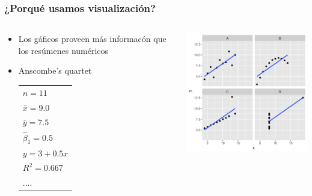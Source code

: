 \documentclass[9pt, spanish]{beamer}\usepackage[]{graphicx}\usepackage[]{color}
\begin{document}
\begin{frame}
\frametitle{¿Porqu\'e usamos visualizaci\'on?}

\begin{columns}
\begin{column}{4cm}
\begin{itemize}
\item Los g\'aficos proveen m\'as informac\'on que los res\'umenes num\'ericos
\item Anscombe’s quartet \cite{anscombe}
\begin{tabular}{l}
 $n = 11$ \\
$\bar x= 9.0$ \\
 $\bar y = 7.5$ \\
 $\hat \beta_1= 0.5$ \\
$ y = 3 + 0.5 x$ \\
 $R^2 = 0.667$ \\
$....$
\end{tabular}

\end{itemize}

\end{column}
\begin{column}{8cm}

\includegraphics[width=8cm]{Quartet} 
\end{column}
\end{columns}
\end{frame}
\end{document}
